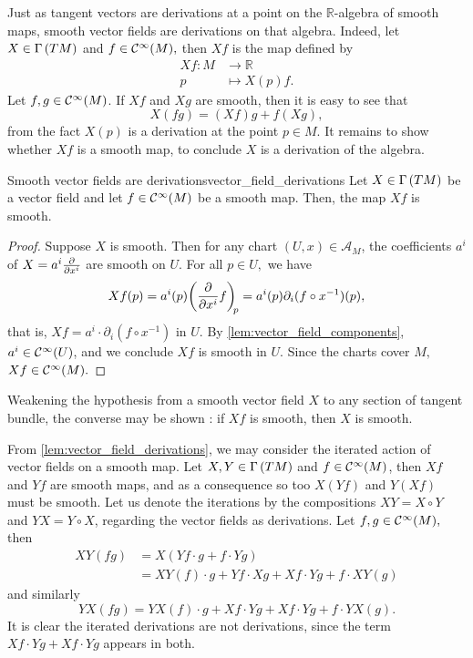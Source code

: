 Just as tangent vectors are derivations at a point on the \(\mathbb{R}\)-algebra  of smooth maps, smooth vector fields are derivations on that algebra. Indeed, let \(X \in \Gamma\left(TM\right)\) and \(f \in \mathcal{C}^\infty(M),\) then \(Xf\) is the map defined by
\begin{align*}
    Xf : M &\to \mathbb{R}\\
         p &\mapsto X(p)f.
\end{align*}
Let \(f,g \in \mathcal{C}^\infty(M)\). If \(Xf\) and \(Xg\) are smooth, then it is easy to see that
\begin{equation*}
    X(fg) = (Xf)g + f(Xg),
\end{equation*}
from the fact \(X(p)\) is a derivation at the point \(p \in M\). It remains to show whether \(Xf\) is a smooth map, to conclude \(X\) is a derivation of the algebra.

\begin{lemma}{Smooth vector fields are derivations}{vector_field_derivations}
    Let \(X \in \Gamma\left(TM\right)\) be a vector field and let \(f \in \mathcal{C}^\infty(M)\) be a smooth map. Then, the map \(Xf\) is smooth.
\end{lemma}
\begin{proof}
    Suppose \(X\) is smooth. Then for any chart \((U, x) \in \mathscr{A}_M\), the coefficients \(a^i\) of \(X = a^i \bfield{x^i}\) are smooth on \(U.\) For all \(p \in U,\) we have
    \begin{equation*}
        Xf(p) = a^i(p) \bvec[f]{x^i}{p} = a^i(p) \partial_i(f \circ x^{-1})(p),
    \end{equation*}
    that is, \(Xf = a^i\cdot \partial_i(f \circ x^{-1})\) in \(U\). By \cref{lem:vector_field_components}, \(a^i \in \mathcal{C}^\infty(U)\), and we conclude \(Xf\) is smooth in \(U\). Since the charts cover \(M,\) \(Xf \in \mathcal{C}^\infty(M).\)
\end{proof}
\begin{remark}
    Weakening the hypothesis from a smooth vector field \(X\) to any section of tangent bundle, the converse may be shown \cite{tu_manifolds}: if \(Xf\) is smooth, then \(X\) is smooth.
\end{remark}

From \cref{lem:vector_field_derivations}, we may consider the iterated action of vector fields on a smooth map. Let \(X, Y \in \Gamma\left(TM\right)\) and \(f \in \mathcal{C}^\infty(M)\), then \(Xf\) and \(Yf\) are smooth maps, and as a consequence so too \(X(Yf)\) and \(Y(Xf)\) must be smooth. Let us denote the iterations by the compositions \(XY = X \circ Y\) and \(YX = Y \circ X\), regarding the vector fields as derivations. Let \(f, g \in \mathcal{C}^\infty(M),\) then
\begin{align*}
    XY(fg) &= X\left(Yf \cdot g + f \cdot Yg\right)\\
           &= XY(f) \cdot g + Yf\cdot Xg + Xf\cdot Yg + f \cdot XY(g)
\end{align*}
and similarly
\begin{equation*}
    YX(fg) = YX(f) \cdot g + Xf\cdot Yg + Xf\cdot Yg + f \cdot YX(g).
\end{equation*}
It is clear the iterated derivations are not derivations, since the term \(Xf\cdot Yg + Xf\cdot Yg\) appears in both.

